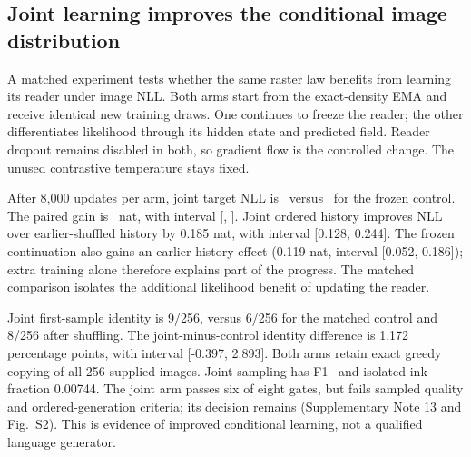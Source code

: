 
\subsection*{Joint learning improves the conditional image distribution}
A matched experiment tests whether the same raster law benefits from learning
its reader under image NLL. Both arms start from the exact-density EMA and
receive identical new training draws. One continues to freeze the reader;
the other differentiates likelihood through its hidden state and predicted
field. Reader dropout remains disabled in both, so gradient flow is the
controlled change. The unused contrastive temperature stays fixed.

After 8,000 updates per arm, joint target NLL is \JointNll\ versus
\ControlNll\ for the frozen control. The paired gain is \JointNllGain\ nat,
with interval [\JointNllLow, \JointNllHigh]. Joint ordered history improves
NLL over earlier-shuffled history by 0.185 nat, with interval [0.128, 0.244].
The frozen continuation also gains an earlier-history effect (0.119 nat,
interval [0.052, 0.186]); extra training alone therefore explains part of the
progress. The matched comparison isolates the additional likelihood benefit
of updating the reader.

Joint first-sample identity is 9/256, versus 6/256 for the matched control and
8/256 after shuffling. The joint-minus-control identity difference is 1.172
percentage points, with interval [-0.397, 2.893]. Both arms retain exact greedy
copying of all 256 supplied images. Joint sampling has F1 \JointSampleFone\
and isolated-ink fraction 0.00744. The joint arm passes six of eight gates,
but fails sampled quality and ordered-generation criteria; its decision remains
\texttt{\JointDecision} (Supplementary Note 13 and Fig.~S2).
This is evidence of improved conditional learning, not a qualified language
generator.

